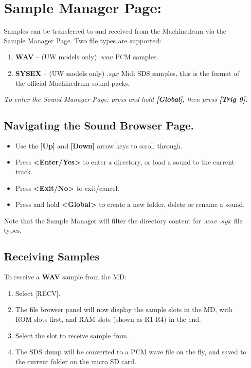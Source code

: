 \chapter{Sample Manager Page:}
Samples can be transferred to and received from the Machinedrum via the Sample Manager Page. Two file types are supported: 
\begin{enumerate}
    \item \textbf{WAV} -- (UW models only) $.wav$ PCM samples.
    \item \textbf{SYSEX} -- (UW models only) $.syx$ Midi SDS samples, this is the format of the official Machinedrum sound packs.
\end{enumerate}

\textit{To enter the Sound Manager Page: press and hold \textbf{[Global]}, then press \textbf{[Trig 9]}.}

\section{Navigating the Sound Browser Page.}


\begin{itemize}
    \item Use the \textbf{[Up]} and \textbf{[Down]} arrow keys to scroll through.
    \item Press \textbf{<Enter/Yes>} to enter a directory, or load a sound to the current track.
    \item Press \textbf{<Exit/No>} to exit/cancel.
    \item Press and hold \textbf{<Global>} to create a new folder, delete or rename a sound.
\end{itemize}

Note that the Sample Manager will filter the directory content for $.wav$ $.syx$ file types.
\newpage
\section{Receiving Samples}
To receive a \textbf{WAV} sample from the MD:
\begin{enumerate}
    \item Select [RECV].
    \item The file browser panel will now display the sample slots in the MD, with ROM slots first, and RAM slots (shown as R1-R4) in the end.
    \item Select the slot to receive sample from.
    \item The SDS dump will be converted to a PCM wave file on the fly, and saved to the current folder on the micro SD card.
\end{enumerate}

